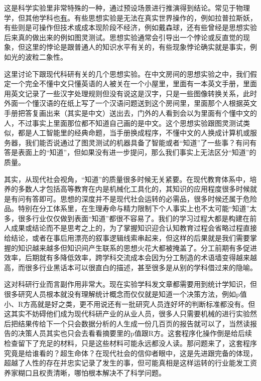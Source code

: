 \documentclass[]{tufte-book}
\begin{document}
这是科学实验里非常特殊的一种，通过预设场景进行推演得到结论。常见于物理学，但其他学科也\href{https://zh.wikipedia.org/wiki/\%E6\%80\%9D\%E6\%83\%B3\%E5\%AF\%A6\%E9\%A9\%97}{有}。有些思想实验是无法在真实世界操作的，例如拉普拉斯妖，有些则是可操作但技术或成本现阶段不经济，例如戴森球，还有些曾经是思想实验后来真的做出来的例如图灵测试。思想实验通常会引导出一个悖论或反直觉的现象，但这里的悖论是跟普通人的知识水平有关的，有些现象悖论确实就是事实，例如光的波粒二象性。

这里讨论下跟现代科研有关的几个思想实验。在中文房间的思想实验之中，我们假定一个完全不懂中文只懂英语的人被关在一个小屋里，里面有一本英文手册，里面用英文记录了一些汉字处理规则但没有说这是汉字，只是一些图像转换关系，此时外面一个懂汉语的在纸上写了一个汉语问题送到这个房间里，里面那个人根据英文手册把答复画出来（其实是中文）送出去，门外的人看到会以为里面有个懂中文的人，不过事实上里面那位都不知道自己画的是中文。这个思想实验跟图灵测试类似，都是人工智能里的经典命题，当手册换成程序，不懂中文的人换成计算机或服务器，我们能否说通过了图灵测试的机器具备了智能或者``知道''了一些事？有问有答是表面上的``知道''，但如果没有进一步提问，那么我们事实上无法区分``知道''的质量。

其实，从现代社会视角，``知道''的质量很多时候无关紧要。在现代教育体系中，培养的多数人才包括高等教育在内是机械化工具化的，其知识的应用程度很多时候就是有问有答即可。思想的深度并不是现代社会运转的必需品，很多时候还属于危险品。特别在分工体系里，在生理寿命与精力限制下个人事实上也不太可能``知道''太多，很多行业仅仅做到表面``知道''都很不容易了。我们的学习过程大都是构建在前人成果或结论而不是思考之上的，为了掌握知识迎合认知教育过程会省略过程直接给结论，或者在事后用漂亮的叙事逻辑线索串起来，但这样的后果就是我们需要掌握的知识越来越多但知识间产生联系的思想火花大都被掩盖了。分工前期有多促进效率，后期就有多降低效率，跨学科交流成本会因为分工制造的术语墙变得越来越高，而很多行业黑话本可以很直白的描述，甚至很多是从别的学科借过来的隐喻。

这对科研行业而言副作用非常大。现在实验学科发文章都需要用到统计学知识，但很多研究人员根本就没有理解统计概念而仅仅就是知道一个决策方法，例如p值小、R方高就是好之类，更不用说还有一批研究人员连好坏的判断标准都没有。但这其实不妨碍他们成为现代科研产业的从业人员，很多人只需要机械的进行实验然后把结果传给下一个只会数据分析的人生成一份几百页的报告就可以了，当然读报告的决策人员其实也只会去看看摘要里的p值跟R方。这套程序化操作倒是给后续检查留下了充足的材料，只是这些材料可能永远都没人读。那问题来了，这套程序究竟是给谁看的？超生命体？在现代社会的信仰者眼中，这是先进跟完备的体现，超越了人性的存在并忠实记录了发生的事，但可能真相是这样运转的行业能发工资养家糊口且权责清晰，哪怕根本解决不了科学问题。
\end{document}
